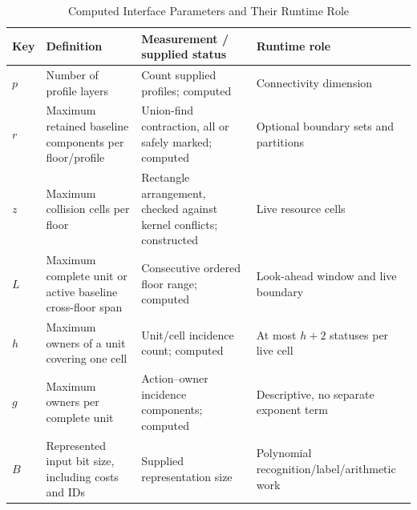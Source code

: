\begin{table}[t]
\caption{Computed Interface Parameters and Their Runtime Role}\label{tab:parameters}
\centering\footnotesize\setlength{\tabcolsep}{3pt}
\begin{tabular}{lp{}p{}p{}}
\toprule Key & Definition & Measurement / supplied status & Runtime role \\\midrule
$p$ & Number of profile layers & Count supplied profiles; computed & Connectivity dimension\\
$r$ & Maximum retained baseline components per floor/profile & Union-find contraction, all or safely marked; computed & Optional boundary sets and partitions\\
$z$ & Maximum collision cells per floor & Rectangle arrangement, checked against kernel conflicts; constructed & Live resource cells\\
$L$ & Maximum complete unit or active baseline cross-floor span & Consecutive ordered floor range; computed & Look-ahead window and live boundary\\
$h$ & Maximum owners of a unit covering one cell & Unit/cell incidence count; computed & At most $h+2$ statuses per live cell\\
$g$ & Maximum owners per complete unit & Action--owner incidence components; computed & Descriptive, no separate exponent term\\
$B$ & Represented input bit size, including costs and IDs & Supplied representation size & Polynomial recognition/label/arithmetic work\\
\bottomrule\end{tabular}\end{table}
